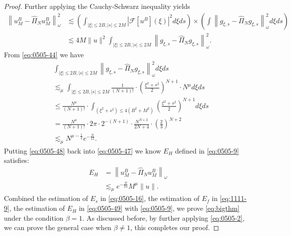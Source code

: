 \documentclass[pdflatex,sn-aps]{sn-jnl}%
\theoremstyle{thmstyleone}%
\theoremstyle{thmstyletwo}%
\theoremstyle{thmstylethree}%
\begin{document}
\begin{proof}
  Further applying the Cauchy-Schwarz inequality yields
  \begin{equation}\label{eq:0505-47}
    \begin{aligned}
    \left\|u_M^B-\widehat{\Pi}_N u_M^B\right\|_\omega^2 & \lesssim\left(\int_{|\xi| \leqslant 2 B,|s| \leqslant 2 M}\left|\mathcal{F}\left[u^B\right](\xi)\right|^2 d \xi d s\right) 
    \times\left(\int\left\|g_{\xi, s}-\widehat{\Pi}_N g_{\xi, s}\right\|_\omega^2 d \xi d s\right) \\
    & \lesssim 4 M\|u\|^2 \int_{|\xi| \leqslant 2 B,|s| \leqslant 2 M}\left\|g_{\xi, s}-\widehat{\Pi}_N g_{\xi, s}\right\|_\omega^2.
    \end{aligned}
  \end{equation}
  From \eqref{eq:0505-44} we have
  \begin{equation}\label{eq:0505-48}
    \begin{aligned}
    & \int_{|\xi| \leqslant 2 B,|s| \leqslant 2 M}\left\|g_{\xi, s}-\widehat{\Pi}_N g_{\xi, s}\right\|_\omega^2 d \xi d s \\
    &\lesssim_\mu \int_{|\xi| \leqslant 2 B,|s| \leqslant 2 M} \frac{1}{(N+1)!} \cdot\left(\frac{\xi^2+s^2}{2}\right)^{N+1} \cdot N^\mu d \xi d s \\
    & \leqslant \frac{N^\mu}{(N+1)!} \cdot \int_{\left(\xi^2+s^2\right) \leqslant 4\left(B^2+M^2\right)}\left(\frac{\xi^2+s^2}{2}\right)^{N+1} d \xi d s \\
    &= \frac{N^\mu}{(N+1)!} \cdot 2 \pi \cdot 2^{-(N+1)} \cdot \frac{N^{N+2}}{2 N+4} \cdot\left(\frac{2}{3}\right)^{N+2} \\
    &\lesssim_\mu N^{\mu-\frac{1}{2}} e^{-\frac{N}{12}}.
    \end{aligned}
  \end{equation}
  Putting \eqref{eq:0505-48} back into \eqref{eq:0505-47} we know
  $E_H$ defined in \eqref{eq:0505-9} satisfies:
  \begin{equation}\label{eq:0505-49}
    \begin{aligned}
    E_H&=\left\|u_M^B-\widehat{\Pi}_N u_M^B\right\|_\omega \\
    &\lesssim_\mu e^{-\frac{N}{24}} M^\mu \|u\|.
    \end{aligned}
  \end{equation}
  Combined the estimation of $E_s$ in \eqref{eq:0505-16}, the estimation
  of $E_f$ in \eqref{eq:1111-9}, the estimation of $E_H$ in \eqref{eq:0505-49}
  with \eqref{eq:0505-9}, we prove \eqref{eq:bigthm} under the condition $\beta = 1$.
  As discussed before, by further applying \eqref{eq:0505-2}, we can prove the general
  case when $\beta \neq 1$, this completes our proof.
\end{proof}
\end{document}
